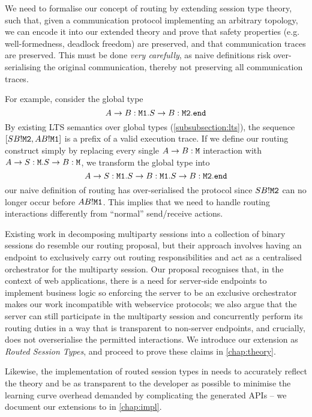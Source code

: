 We need to formalise our concept of routing by extending session
type theory, such that, given a communication protocol implementing 
an arbitrary topology, we can encode it into our extended theory and
prove that safety properties (e.g. well-formedness, deadlock freedom)
are preserved, and that communication traces are preserved.
This must be done \textit{very carefully}, as
naive definitions risk over-serialising the original communication,
thereby not preserving all communication traces.

For example, consider the global type
\[
A \to B: \texttt{M1}. S \to B: \texttt{M2}. \texttt{end}
\]
By existing LTS semantics over
global types (\cref{subsubsection:lts}), the sequence 
$[SB!\texttt{M2}, AB!\texttt{M1}]$
is a prefix of a valid execution trace.
If we define our routing construct simply by replacing every single
$A \to B: \texttt{M}$ interaction with $A \to S: \texttt{M}.
S \to B: \texttt{M}$, we transform the global type into
\[
A \to S: \texttt{M1}. S \to B: \texttt{M1}. S \to B: \texttt{M2}. \texttt{end}
\]
our naive definition of routing has over-serialised the protocol
since $SB!\texttt{M2}$ can no longer occur before $AB!\texttt{M1}$.
This implies that we need to handle routing interactions differently
from ``normal'' send/receive actions.

Existing work in decomposing multiparty sessions into a collection
of binary sessions do resemble our routing proposal, but their approach
involves having an endpoint to exclusively carry out
routing responsibilities and act as a centralised orchestrator 
for the multiparty session.
Our proposal recognises that, in the context of web applications,
there is a need for server-side endpoints to implement business logic
so enforcing the server to be an exclusive orchestrator makes our work
incompatible with webservice protocols; 
we also argue that the server can still participate in the 
multiparty session and concurrently perform its routing duties
in a way that is transparent to non-server endpoints, and crucially,
does not overserialise the permitted interactions. 
We introduce our extension as \textit{Routed Session Types},
and proceed to prove these claims in \cref{chap:theory}.

Likewise, the implementation of routed session types 
in  needs to accurately reflect the theory
and be as transparent to the developer as possible to minimise
the learning curve overhead demanded 
by complicating the generated APIs -- we document our extensions
to  in \cref{chap:impl}.